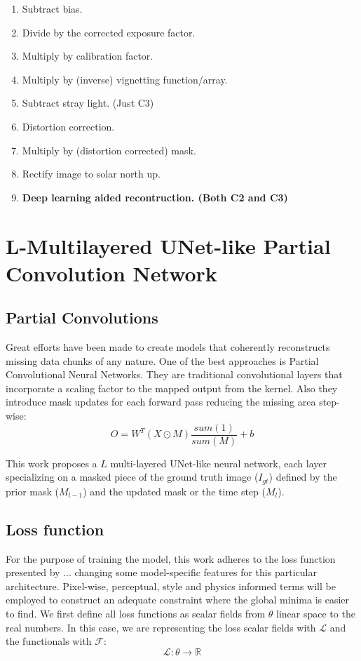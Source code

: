 \documentclass[draft]{agujournal2019}
\begin{document}
\begin{enumerate}
    \item Subtract bias.
    \item Divide by the corrected exposure factor.
    \item Multiply by calibration factor.
    \item Multiply by (inverse) vignetting function/array.
    \item Subtract stray light. (Just C3)
    \item Distortion correction.
    \item Multiply by (distortion corrected) mask.
    \item Rectify image to solar north up.
    \item \textbf{Deep learning aided recontruction. (Both C2 and C3)}
\end{enumerate}

\section{L-Multilayered UNet-like Partial Convolution Network}

\subsection{Partial Convolutions}
Great efforts have been made to create models that coherently reconstructs missing data chunks of any nature. One of the best approaches is Partial Convolutional Neural Networks. They are traditional convolutional layers that incorporate a scaling factor to the mapped output from the kernel. Also they introduce mask updates for each forward pass reducing the missing area step-wise:
\begin{equation}
    O = W^T(X \odot M)\frac{sum(1)}{sum(M)} + b
\end{equation}

This work proposes a $L$ multi-layered UNet-like neural network, each layer specializing on a masked piece of the ground truth image ($I_{gt}$) defined by the prior mask ($M_{l-1}$) and the updated mask or the time step ($M_{l}$).

\subsection{Loss function}
For the purpose of training the model, this work adheres to the loss function presented by ... changing some model-specific features for this particular architecture. Pixel-wise, perceptual, style and physics informed terms will be employed to construct an adequate constraint where the global minima is easier to find. We first define all loss functions as scalar fields from \textbf{$\theta$} linear space to the real numbers. In this case, we are representing the loss scalar fields with $\mathcal{L}$ and the functionals with $\boldsymbol{\mathcal{F}}$:
\begin{equation}
    \mathcal{L} : \theta \to \mathbb{R}
\end{equation}
\end{document}
